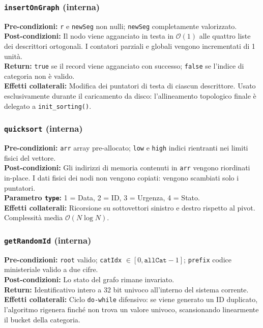 \documentclass[12pt, a4paper]{article}
\begin{document}
\subsubsection{\texttt{insertOnGraph} (interna)}
\vspace{3mm}
\begin{specbox}
\textbf{Pre-condizioni:} \texttt{r} e \texttt{newSeg} non nulli; \texttt{newSeg} completamente valorizzato. \\
\textbf{Post-condizioni:} Il nodo viene agganciato in testa in $\mathcal{O}(1)$ alle quattro liste dei descrittori ortogonali. I contatori parziali e globali vengono incrementati di 1 unità. \\
\textbf{Return:} \texttt{true} se il record viene agganciato con successo; \texttt{false} se l'indice di categoria non è valido. \\
\textbf{Effetti collaterali:} Modifica dei puntatori di testa di ciascun descrittore. Usato esclusivamente durante il caricamento da disco: l'allineamento topologico finale è delegato a \texttt{init\_sorting()}.
\end{specbox}

\newpage

\subsubsection{\texttt{quicksort} (interna)}
\vspace{3mm}
\begin{specbox}
\textbf{Pre-condizioni:} \texttt{arr} array pre-allocato; \texttt{low} e \texttt{high} indici rientranti nei limiti fisici del vettore. \\
\textbf{Post-condizioni:} Gli indirizzi di memoria contenuti in \texttt{arr} vengono riordinati in-place. I dati fisici dei nodi non vengono copiati: vengono scambiati solo i puntatori. \\
\textbf{Parametro \texttt{type}:} 1 = Data, 2 = ID, 3 = Urgenza, 4 = Stato. \\
\textbf{Effetti collaterali:} Ricorsione su sottovettori sinistro e destro rispetto al pivot. Complessità media $\mathcal{O}(N \log N)$.
\end{specbox}

\subsubsection{\texttt{getRandomId} (interna)}
\vspace{3mm}
\begin{specbox}
\textbf{Pre-condizioni:} \texttt{root} valido; \texttt{catIdx} $\in [0, \texttt{allCat}-1]$; \texttt{prefix} codice ministeriale valido a due cifre. \\
\textbf{Post-condizioni:} Lo stato del grafo rimane invariato. \\
\textbf{Return:} Identificativo intero a 32 bit univoco all'interno del sistema corrente. \\
\textbf{Effetti collaterali:} Ciclo \texttt{do-while} difensivo: se viene generato un ID duplicato, l'algoritmo rigenera finché non trova un valore univoco, scansionando linearmente il bucket della categoria.
\end{specbox}
\end{document}
